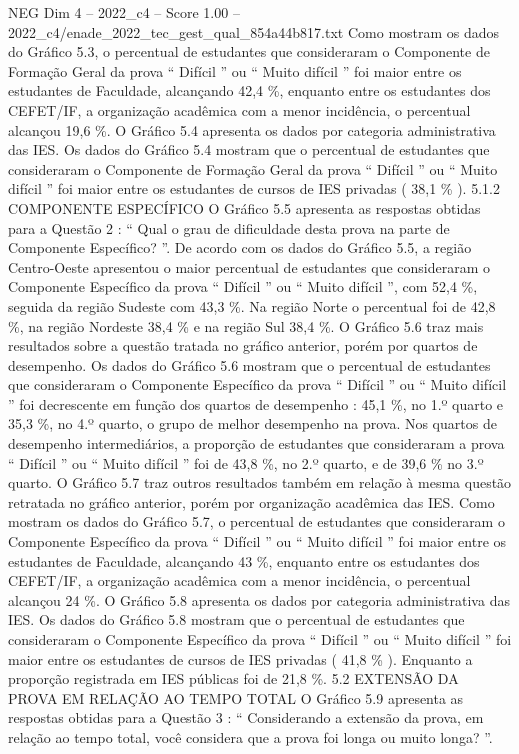 \begin{textsample}{NEG Dim 4 – 2022\_c4 – Score 1.00 – 2022\_c4/enade\_2022\_tec\_gest\_qual\_854a44b817.txt}
Como mostram os dados do Gráfico 5.3, o percentual de estudantes que consideraram o Componente de Formação Geral da prova “ Difícil ” ou “ Muito difícil ” foi maior entre os estudantes de Faculdade, alcançando 42,4 \%, enquanto entre os estudantes dos CEFET/IF, a organização acadêmica com a menor incidência, o percentual alcançou 19,6 \%.
O Gráfico 5.4 apresenta os dados por categoria administrativa das IES.
Os dados do Gráfico 5.4 mostram que o percentual de estudantes que consideraram o Componente de Formação Geral da prova “ Difícil ” ou “ Muito difícil ” foi maior entre os estudantes de cursos de IES privadas ( 38,1 \% ). 5.1.2 COMPONENTE ESPECÍFICO O Gráfico 5.5 apresenta as respostas obtidas para a Questão 2 : “ Qual o grau de dificuldade desta prova na parte de Componente Específico? ”.
De acordo com os dados do Gráfico 5.5, a região Centro-Oeste apresentou o maior percentual de estudantes que consideraram o Componente Específico da prova “ Difícil ” ou “ Muito difícil ”, com 52,4 \%, seguida da região Sudeste com 43,3 \%.
Na região Norte o percentual foi de 42,8 \%, na região Nordeste 38,4 \% e na região Sul 38,4 \%.
O Gráfico 5.6 traz mais resultados sobre a questão tratada no gráfico anterior, porém por quartos de desempenho.
Os dados do Gráfico 5.6 mostram que o percentual de estudantes que consideraram o Componente Específico da prova “ Difícil ” ou “ Muito difícil ” foi decrescente em função dos quartos de desempenho : 45,1 \%, no 1.º quarto e 35,3 \%, no 4.º quarto, o grupo de melhor desempenho na prova.
Nos quartos de desempenho intermediários, a proporção de estudantes que consideraram a prova “ Difícil ” ou “ Muito difícil ” foi de 43,8 \%, no 2.º quarto, e de 39,6 \% no 3.º quarto.
O Gráfico 5.7 traz outros resultados também em relação à mesma questão retratada no gráfico anterior, porém por organização acadêmica das IES.
Como mostram os dados do Gráfico 5.7, o percentual de estudantes que consideraram o Componente Específico da prova “ Difícil ” ou “ Muito difícil ” foi maior entre os estudantes de Faculdade, alcançando 43 \%, enquanto entre os estudantes dos CEFET/IF, a organização acadêmica com a menor incidência, o percentual alcançou 24 \%.
O Gráfico 5.8 apresenta os dados por categoria administrativa das IES.
Os dados do Gráfico 5.8 mostram que o percentual de estudantes que consideraram o Componente Específico da prova “ Difícil ” ou “ Muito difícil ” foi maior entre os estudantes de cursos de IES privadas ( 41,8 \% ).
Enquanto a proporção registrada em IES públicas foi de 21,8 \%. 5.2 EXTENSÃO DA PROVA EM RELAÇÃO AO TEMPO TOTAL O Gráfico 5.9 apresenta as respostas obtidas para a Questão 3 : “ Considerando a extensão da prova, em relação ao tempo total, você considera que a prova foi longa ou muito longa? ”.

\end{textsample}
